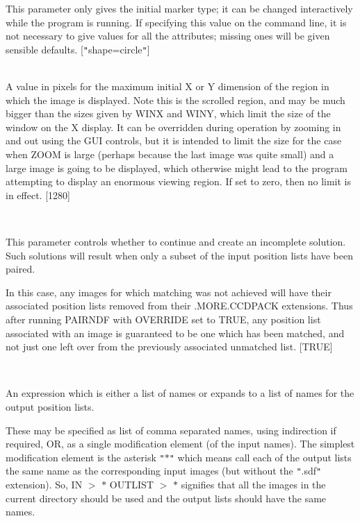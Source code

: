 \documentclass[twoside,11pt]{article}
\renewcommand{\_}{\texttt{\symbol{95}}}
\newcommand{\routine}[1]{{\sc #1}}
\newcommand{\sstsubsection}[1]{ \item[{#1}] \mbox{} \\}
\newcommand{\sstsubsection}[1]{\item[{#1}]}
\begin{document}
{{{{         }
         This parameter only gives the initial marker type; it can be
         changed interactively while the program is running.
         If specifying this value on the command line, it is not
         necessary to give values for all the attributes; missing ones
         will be given sensible defaults.
         [{\tt "}shape=circle{\tt "}]
      }
      \sstsubsection{
         MAXCANV = \_INTEGER (Read and Write)
      }{
         A value in pixels for the maximum initial X or Y dimension of
         the region in which the image is displayed.  Note this is the
         scrolled region, and may be much bigger than the sizes given
         by WINX and WINY, which limit the size of the window on the
         X display.  It can be overridden during operation by zooming
         in and out using the GUI controls, but it is intended to
         limit the size for the case when ZOOM is large (perhaps
         because the last image was quite small) and a large image
         is going to be displayed, which otherwise might lead to
         the program attempting to display an enormous viewing region.
         If set to zero, then no limit is in effect.
         [1280]
      }
      \sstsubsection{
         OVERRIDE = \_LOGICAL (Read)
      }{
         This parameter controls whether to continue and create an
         incomplete solution. Such solutions will result when only a
         subset of the input position lists have been paired.

         In this case, any images for which matching was not
         achieved will have their associated position lists removed
         from their .MORE.CCDPACK extensions.  Thus after running
         \routine{PAIRNDF} with OVERRIDE set to TRUE, any position list associated
         with an image is guaranteed to be one which has been matched, and
         not just one left over from the previously associated unmatched
         list.
         [TRUE]
      }
      \sstsubsection{
         OUTLIST = LITERAL (Read)
      }{
         An expression which is either a list of names or expands to a
         list of names for the output position lists.

         These may be specified as list of comma separated names,
         using indirection if required, OR, as a single modification
         element (of the input names). The simplest modification
         element is the asterisk {\tt "}$*${\tt "} which means call each of the
         output lists the same name as the corresponding input images (but
         without the {\tt "}.sdf{\tt "} extension).
         So,
            IN $>$ $*$
            OUTLIST $>$ $*$
         signifies that all the images in the current directory should be
         used and the output lists should have the same names.

}}}
\end{document}
